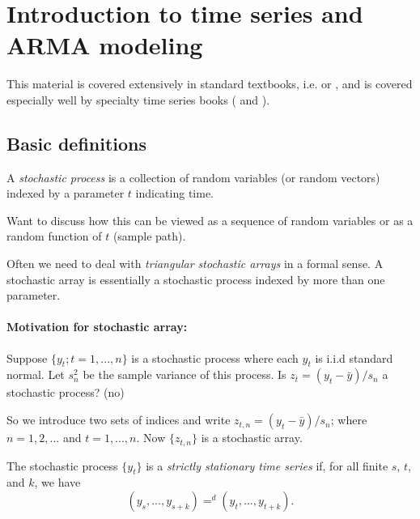 

\section{Introduction to time series and ARMA modeling}

This material is covered extensively in standard textbooks,
i.e. \citet{Ha00} or \citet{Gr12}, and is covered especially well by
specialty time series books (\citealp{BD91} and \citealp{Ha94}).

\subsection{Basic definitions}

\begin{defn}
  A \emph{stochastic process} is a collection of random variables (or
  random vectors) indexed by a parameter $t$ indicating time.
\end{defn}

Want to discuss how this can be viewed as a sequence of random
variables or as a random function of $t$ (sample path).

Often we need to deal with \emph{triangular stochastic arrays} in a
formal sense. A stochastic array is essentially a stochastic process
indexed by more than one parameter.

\paragraph{Motivation for stochastic array:}
Suppose $\{y_t; t=1,...,n\}$ is a stochastic process where each $y_t$
is i.i.d standard normal. Let $s^2_n$ be the sample variance of this
process. Is $z_t = (y_t - \bar y) / s_n$ a stochastic process?  (no)

So we introduce two sets of indices and write $z_{t,n} = (y_t - \bar
y) / s_n$; where $n = 1,2,...$ and $t = 1,...,n$.  Now $\{z_{t,n}\}$
is a stochastic array.

\begin{defn}
  The stochastic process $\{y_t\}$ is a \emph{strictly stationary time
    series} if, for all finite $s$, $t$, and $k$, we have
  \begin{equation*}
    (y_s,...,y_{s+k}) =^d (y_t,...,y_{t+k}).
  \end{equation*}
\end{defn}

